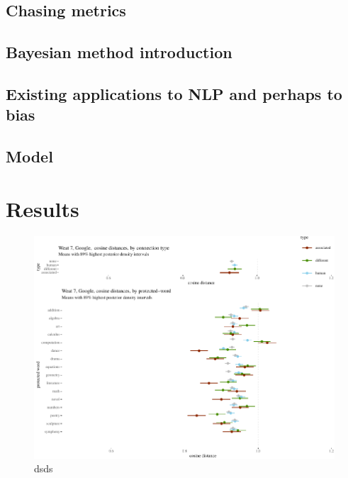 \documentclass[
  10pt,
  dvipsnames,enabledeprecatedfontcommands]{scrartcl}
\begin{document}
\hypertarget{chasing-metrics}{%
\subsection{Chasing metrics}\label{chasing-metrics}}

\hypertarget{bayesian-method-introduction}{%
\subsection{Bayesian method
introduction}\label{bayesian-method-introduction}}

\hypertarget{existing-applications-to-nlp-and-perhaps-to-bias}{%
\subsection{Existing applications to NLP and perhaps to
bias}\label{existing-applications-to-nlp-and-perhaps-to-bias}}

\hypertarget{model}{%
\subsection{Model}\label{model}}

\hypertarget{results}{%
\section{Results}\label{results}}

\vspace{1mm}
\footnotesize

\begin{figure}


\begin{center}\includegraphics[width=1.1\linewidth]{paperDraft6_files/figure-latex/unnamed-chunk-1-1} \end{center}
\caption{dsds}
\label{fig:weat7google}
\end{figure}
\end{document}
